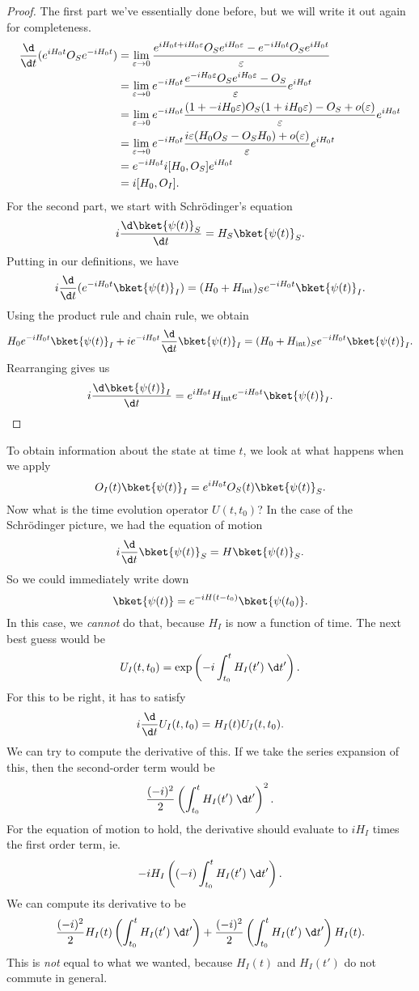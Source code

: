 \documentclass[a4paper]{article}
\begin{document}
\begin{proof}
  The first part we've essentially done before, but we will write it out again for completeness.
  \begin{align*}
    \frac{\d}{\d t} (e^{iH_0 t}O_S e^{-iH_0 t}) &= \lim_{\varepsilon \to 0} \frac{e^{iH_0t + iH_0 \varepsilon} O_S e^{iH_0 \varepsilon} - e^{-iH_0 t}O_Se^{iH_0 t}}{\varepsilon}\\
    &= \lim_{\varepsilon \to 0} e^{-iH_0 t}\frac{e^{-iH_0 \varepsilon}O_S e^{iH_0 \varepsilon}- O_S}{\varepsilon} e^{iH_0 t}\\
    &= \lim_{\varepsilon \to 0} e^{-iH_0 t}\frac{(1 + -iH_0 \varepsilon)O_S(1 + iH_0 \varepsilon) - O_S + o(\varepsilon)}{\varepsilon} e^{iH_0 t}\\
    &= \lim_{\varepsilon \to 0} e^{-iH_0 t} \frac{i\varepsilon (H_0 O_S - O_SH_0 ) + o(\varepsilon)}{\varepsilon}e^{iH_0 t}\\
    &= e^{-iH_0 t}i [H_0 , O_S] e^{iH_0 t}\\
    &= i [H_0, O_I].
  \end{align*}
  For the second part, we start with Schr\"odinger's equation
  \[
    i \frac{\d \bket{\psi(t)}_S}{\d t} = H_S \bket{\psi(t)}_S.
  \]
  Putting in our definitions, we have
  \[
    i \frac{\d}{\d t}(e^{-iH_0 t}\bket{\psi(t)}_I) = (H_0 + H_{\mathrm{int}})_S e^{-iH_0 t} \bket{\psi(t)}_I.
  \]
  Using the product rule and chain rule, we obtain
  \[
    H_0 e^{-iH_0 t}\bket{\psi(t)}_I + ie^{-iH_0t}\frac{\d}{\d t}\bket{\psi(t)}_I = (H_0 + H_{\mathrm{int}})_S e^{-iH_0 t} \bket{\psi(t)}_I.
  \]
  Rearranging gives us
  \[
    i \frac{\d \bket{\psi(t)}_I}{\d t} = e^{iH_0 t} H_{\mathrm{int}} e^{-iH_0 t} \bket{\psi(t)}_I.
  \]
\end{proof}
To obtain information about the state at time $t$, we look at what happens when we apply
\[
  O_I(t) \bket{\psi(t)}_I = e^{iH_0t}O_S(t) \bket{\psi(t)}_S.
\]
Now what is the time evolution operator $U(t, t_0)$? In the case of the Schr\"odinger picture, we had the equation of motion
\[
  i\frac{\d}{\d t}\bket{\psi(t)}_S = H\bket{\psi(t)}_S.
\]
So we could immediately write down
\[
  \bket{\psi(t)} = e^{-iH(t - t_0)} \bket{\psi(t_0)}.
\]
In this case, we \emph{cannot} do that, because $H_I$ is now a function of time. The next best guess would be
\[
  U_I(t, t_0) = \exp\left(-i \int_{t_0}^t H_I(t') \;\d t'\right).
\]
For this to be right, it has to satisfy
\[
  i\frac{\d}{\d t}U_I(t, t_0) = H_I(t) U_I(t, t_0).
\]
We can try to compute the derivative of this. If we take the series expansion of this, then the second-order term would be
\[
  \frac{(-i)^2}{2} \left(\int_{t_0}^t H_I(t') \;\d t'\right)^2.
\]
For the equation of motion to hold, the derivative should evaluate to $iH_I$ times the first order term, ie.
\[
  -i H_I \left( (-i)\int_{t_0}^t H_I(t')\;\d t'\right).
\]
We can compute its derivative to be
\[
  \frac{(-i)^2}{2} H_I(t) \left(\int_{t_0}^t H_I(t')\;\d t'\right) + \frac{(-i)^2}{2} \left(\int_{t_0}^t H_I(t') \;\d t'\right) H_I(t) .
\]
This is \emph{not} equal to what we wanted, because $H_I(t)$ and $H_I(t')$ do not commute in general.
\end{document}
